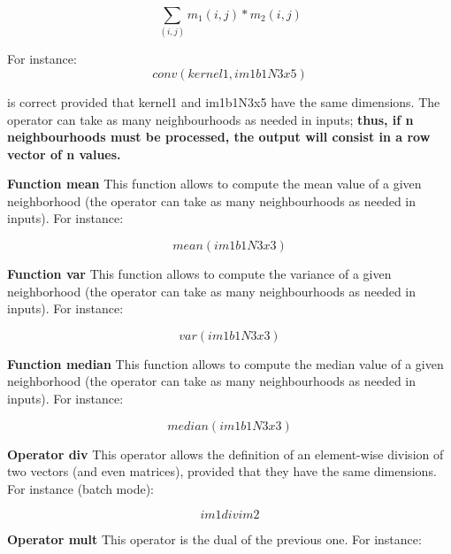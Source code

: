 \begin{equation}
\sum_{(i,j)} m_1(i,j)*m_2(i,j)
\end{equation}

For instance: 
\begin{equation}
  conv(kernel1,im1b1N3x5)
\end{equation}

is correct provided that kernel1 and im1b1N3x5 have the same dimensions. The operator can take as many neighbourhoods as needed in inputs; \textbf{thus, if n neighbourhoods must be processed, the output will consist in a row vector of n values.} 

\textbf{Function mean} \newline
This function allows to compute the mean value of a given neighborhood (the operator can take
as many neighbourhoods as needed in inputs). For instance:

\begin{equation}
	mean(im1b1N3x3)
\end{equation}

\textbf{Function var} \newline
This function allows to compute the variance of a given neighborhood (the operator can take
as many neighbourhoods as needed in inputs). For instance:

\begin{equation}
	var(im1b1N3x3)
\end{equation} 

\textbf{Function median} \newline
This function allows to compute the median value of a given neighborhood (the operator can take
as many neighbourhoods as needed in inputs). For instance:

\begin{equation}
	median(im1b1N3x3)
\end{equation}


\textbf{Operator div} \newline
This operator allows the definition of an element-wise division of two vectors (and even matrices), provided that they have the same dimensions. For instance (batch mode): 

\begin{equation}
	im1  div  im2
\end{equation}

\textbf{Operator mult} \newline
This operator is the dual of the previous one. For instance:

